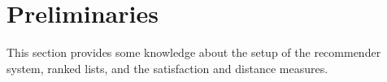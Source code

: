 \section{Preliminaries}\label{sec:preliminaries}
This section provides some knowledge about the setup of the recommender system, ranked lists, and the satisfaction and distance measures.

